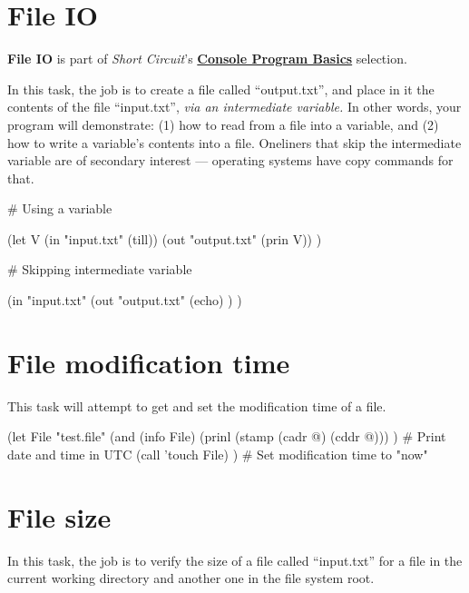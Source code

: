 \pagebreak{}
\section*{File IO}


\textbf{File IO} is part of \emph{Short Circuit}'s
\textbf{\href{/wiki/Category:Selection/Short\_Circuit/Console\_Program\_Basics}{Console
    Program Basics}} selection.

In this task, the job is to create a file called ``output.txt'', and
place in it the contents of the file ``input.txt'', \emph{via an
intermediate variable.} In other words, your program will demonstrate:
(1) how to read from a file into a variable, and (2) how to write a
variable's contents into a file. Oneliners that skip the intermediate
variable are of secondary interest --- operating systems have copy
commands for that.

\begin{wideverbatim}

# Using a variable

(let V (in "input.txt" (till))
   (out "output.txt" (prin V)) )

# Skipping intermediate variable

(in "input.txt"
   (out "output.txt"
      (echo) ) )

\end{wideverbatim}

\pagebreak{}
\section*{File modification time}

This task will attempt to get and set the modification time of a file.

\begin{wideverbatim}

(let File "test.file"
   (and
      (info File)
      (prinl (stamp (cadr @) (cddr @))) ) # Print date and time in UTC
   (call 'touch File) )                   # Set modification time to "now"

\end{wideverbatim}

\pagebreak{}
\section*{File size}

In this task, the job is to verify the size of a file called
``input.txt'' for a file in the current working directory and another
one in the file system root.

